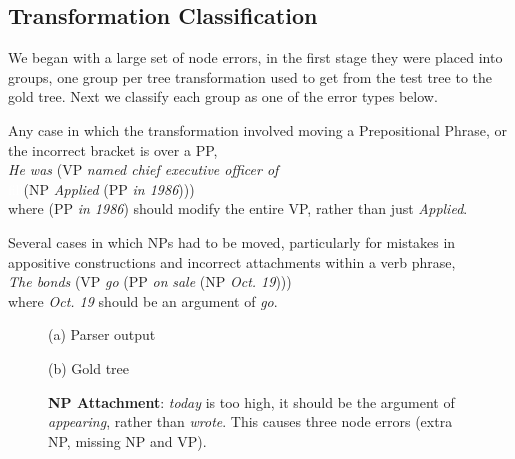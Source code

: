 \subsection{Transformation Classification}

We began with a large set of node errors, in the first stage they were placed
into groups, one group per tree transformation used to get from the test tree
to the gold tree.  Next we classify each group as one of the error types below.

\begin{description}\itemsep1pt
	\item[ PP Attachment] Any case in which the transformation involved moving
	a Prepositional Phrase, or the incorrect bracket is over a PP, \eg \\ 
	\emph{He was} (VP \emph{named chief executive officer of} \\
	\textcolor{white}{fill}(NP \emph{Applied} (PP \emph{in 1986}))) \\
	where (PP \emph{in 1986}) should modify the entire VP, rather than just \emph{Applied}.

	\item[ NP Attachment] Several cases in which NPs had to be moved,
	particularly for mistakes in appositive constructions and incorrect
	attachments within a verb phrase, \eg \\ \emph{The bonds} (VP \emph{go} (PP
	\emph{on} \emph{sale} (NP \emph{Oct.\@\xspace 19}))) \\
	where \emph{Oct.\@\xspace 19} should be an argument of \emph{go}.
\end{description}


\begin{figure}
\begin{center}

\small
(a) Parser output

\vspace{3mm}


\small
(b) Gold tree
\end{center}
\derivspace
\caption{
	\label{fig:NP-attachment}
	\textbf{NP Attachment}: \emph{today} is too high, it should be the argument
	of \emph{appearing}, rather than \emph{wrote}.  This causes three node errors
	(extra NP, missing NP and VP).
}
\derivaftercompress
\end{figure}

